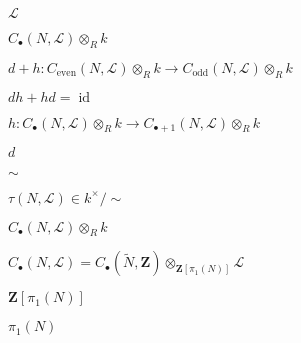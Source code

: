 \begin{preview}
\setcounter{equation}{0}%
\( \mathcal{L} \)
\end{preview}

\begin{preview}
\setcounter{equation}{0}%
\(  C_{\bullet} (N , \mathcal{L}) \otimes _R k \)
\end{preview}

\begin{preview}
\setcounter{equation}{0}%
\( d+h : C_{\mathrm{even}}(N , \mathcal{L}) \otimes  _{R }k  \to C_{\mathrm{odd}}(N , \mathcal{L})\otimes  _{R }k \)
\end{preview}

\begin{preview}
\setcounter{equation}{0}%
\( dh + hd = \operatorname{id} \)
\end{preview}

\begin{preview}
\setcounter{equation}{0}%
\( h:  C_{\bullet} (N , \mathcal{L}) \otimes _R k  \to  C_{\bullet + 1}(N , \mathcal{L})\otimes _R k  \)
\end{preview}

\begin{preview}
\setcounter{equation}{0}%
\( d \)
\end{preview}

\begin{preview}
\setcounter{equation}{0}%
\( \sim \)
\end{preview}

\begin{preview}
\setcounter{equation}{0}%
\( \tau(N, \mathcal{L})\in k^{\times } /\sim \)
\end{preview}

\begin{preview}
\setcounter{equation}{0}%
\(  C_{\bullet} (N , \mathcal{L})\otimes _R k \)
\end{preview}

\begin{preview}
\setcounter{equation}{0}%
\(  C_{\bullet} (N , \mathcal{L}) =  C_{\bullet} ( \widetilde{N}, \mathbf{Z}) \otimes _{\mathbf{Z}[ \pi_1(N) ]} \mathcal{L} \)
\end{preview}

\begin{preview}
\setcounter{equation}{0}%
\( \mathbf{Z}[ \pi_1(N) ] \)
\end{preview}

\begin{preview}
\setcounter{equation}{0}%
\( \pi_1( N) \)
\end{preview}


